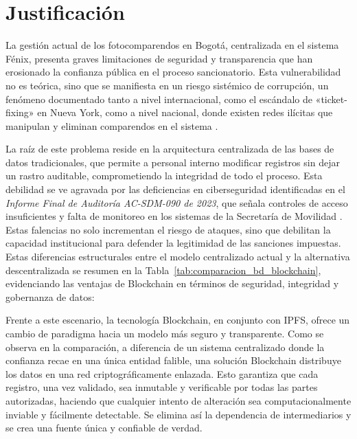 \section{\large Justificación}
La gestión actual de los fotocomparendos en Bogotá, centralizada en el sistema Fénix, presenta graves limitaciones de seguridad y transparencia que han erosionado la confianza pública en el proceso sancionatorio. Esta vulnerabilidad no es teórica, sino que se manifiesta en un riesgo sistémico de corrupción, un fenómeno documentado tanto a nivel internacional, como el escándalo de «ticket-fixing» en Nueva York, como a nivel nacional, donde existen redes ilícitas que manipulan y eliminan comparendos en el sistema \parencite{barbaro2011ticketfixing, blogAletta, procuraduriaBucaramanga}.

La raíz de este problema reside en la arquitectura centralizada de las bases de datos tradicionales, que permite a personal interno modificar registros sin dejar un rastro auditable, comprometiendo la integridad de todo el proceso. Esta debilidad se ve agravada por las deficiencias en ciberseguridad identificadas en el \textit{Informe Final de Auditoría AC-SDM-090 de 2023}, que señala controles de acceso insuficientes y falta de monitoreo en los sistemas de la Secretaría de Movilidad \parencite{auditoriaSDM}. Estas falencias no solo incrementan el riesgo de ataques, sino que debilitan la capacidad institucional para defender la legitimidad de las sanciones impuestas.
Estas diferencias estructurales entre el modelo centralizado actual y la alternativa descentralizada se resumen en la Tabla~\ref{tab:comparacion_bd_blockchain}, evidenciando las ventajas de Blockchain en términos de seguridad, integridad y gobernanza de datos:



Frente a este escenario, la tecnología Blockchain, en conjunto con IPFS, ofrece un cambio de paradigma hacia un modelo más seguro y transparente. Como se observa en la comparación, a diferencia de un sistema centralizado donde la confianza recae en una única entidad falible, una solución Blockchain distribuye los datos en una red criptográficamente enlazada. Esto garantiza que cada registro, una vez validado, sea inmutable y verificable por todas las partes autorizadas, haciendo que cualquier intento de alteración sea computacionalmente inviable y fácilmente detectable. Se elimina así la dependencia de intermediarios y se crea una fuente única y confiable de verdad.

